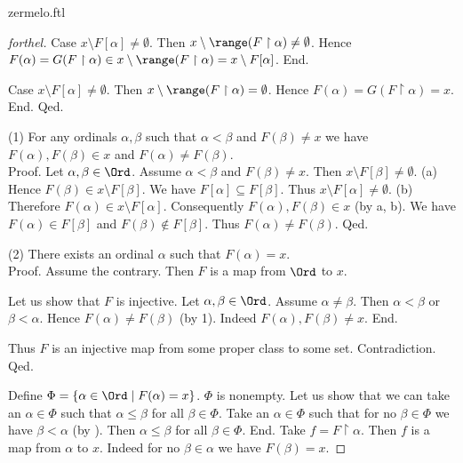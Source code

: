 \documentclass{naproche-library}
\begin{document}
\begin{smodule}{zermelo.ftl}
\begin{proof}[forthel]
      Case $x \setminus F[\alpha] \neq \emptyset$.
        Then $x \setminus \range(F \restriction \alpha) \neq \emptyset$.
        Hence $F(\alpha)
          = G(F \restriction \alpha)
          \in x \setminus \range(F \restriction \alpha)
          = x \setminus F[\alpha]$.
      End.

      Case $x \setminus F[\alpha] \neq \emptyset$.
        Then $x \setminus \range(F \restriction \alpha) = \emptyset$.
        Hence $F(\alpha)
          = G(F \restriction \alpha)
          = x$.
      End.
    Qed.

    (1) For any ordinals $\alpha, \beta$ such that $\alpha < \beta$ and $F(\beta) \neq x$ we have $F(\alpha), F(\beta) \in x$ and $F(\alpha) \neq F(\beta)$. \\
    Proof.
      Let $\alpha, \beta \in \Ord$.
      Assume $\alpha < \beta$ and $F(\beta) \neq x$.
      Then $x \setminus F[\beta] \neq \emptyset$.
      (a) Hence $F(\beta) \in x \setminus F[\beta]$.
      We have $F[\alpha] \subseteq F[\beta]$.
      Thus $x \setminus F[\alpha] \neq \emptyset$.
      (b) Therefore $F(\alpha) \in x \setminus F[\alpha]$.
      Consequently $F(\alpha), F(\beta) \in x$ (by a, b).
      We have $F(\alpha) \in F[\beta]$ and $F(\beta) \notin F[\beta]$.
      Thus $F(\alpha) \neq F(\beta)$.
    Qed.

    (2) There exists an ordinal $\alpha$ such that $F(\alpha) = x$. \\
    Proof.
      Assume the contrary.
      Then $F$ is a map from $\Ord$ to $x$.

      Let us show that $F$ is injective.
        Let $\alpha, \beta \in \Ord$.
        Assume $\alpha \neq \beta$.
        Then $\alpha < \beta$ or $\beta < \alpha$.
        Hence $F(\alpha) \neq F(\beta)$ (by 1).
        Indeed $F(\alpha), F(\beta) \neq x$.
      End.

      Thus $F$ is an injective map from some proper class to some set.
      Contradiction.
    Qed.

    Define $\Phi = \{ \alpha \in \Ord \mid F(\alpha) = x \}$.
    $\Phi$ is nonempty.
    Let us show that we can take an $\alpha \in \Phi$ such that $\alpha \leq \beta$ for all $\beta \in \Phi$.
      Take an $\alpha \in \Phi$ such that for no $\beta \in \Phi$ we have $\beta < \alpha$ (by ).
      Then $\alpha \leq \beta$ for all $\beta \in \Phi$.
    End.
    Take $f = F \restriction \alpha$.
    Then $f$ is a map from $\alpha$ to $x$.
    Indeed for no $\beta \in \alpha$ we have $F(\beta) = x$.


\end{proof}
\end{smodule}
\end{document}

